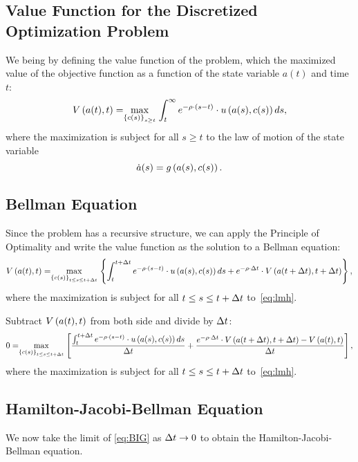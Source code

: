\documentclass[letterpaper,12pt,leqno]{article}
\begin{document}
\subsection{Value Function for the Discretized Optimization Problem}

We being by defining the value function of the problem, which the maximized value of the objective function as a function of the
state variable $a(t)$ and time $t$:
\begin{equation*}
V\bp{a(t),t} =\underset{\bc{c(s)}_{s\geq t}}{\max} \int_{t}^{\infty }e^{-\r \cdot \bp{s-t}}\cdot u\bp{a(s),c(s)} ds,
\end{equation*}
where the maximization is subject for all $s\geq t$ to the law of motion of the state variable
\begin{equation}
\dot{a}(s)=g\left( a(s),c(s) \right).\label{eq:lmh}
\end{equation}

\subsection{Bellman Equation}

Since the problem has a recursive structure, we can apply the Principle of Optimality and write the value function as the solution to a Bellman equation:
\begin{align*}
V\bp{ a(t),t} =\underset{\bc{c(s)}_{t\leq s\leq t+\D t}}{\max }\bc{\int_{t}^{t+\D t}e^{-\r \cdot \bp{ s-t}} \cdot u\bp{a(s),c(s)} ds+e^{-\r  \cdot \D t} \cdot V\bp{ a(t+\D t),t+\D t} },
\end{align*}
where the maximization is subject for all $t\leq s\leq t+\Delta t$ to~\eqref{eq:lmh}.

Subtract $V\left( a(t),t \right) $ from both side and divide by $\Delta t$:
\begin{align}
0=\underset{\bc{c(s)}_{t\leq s\leq t+\D t}}{\max }\bs{\frac{\int_{t}^{t+\D t}e^{-\r \cdot \bp{ s-t}} \cdot u\bp{
a(s),c(s)} ds}{\D t}+ \frac{e^{-\r  \cdot \D t} \cdot V\bp{ a(t+\D t),t+\D t}-V\bp{ a(t),t}}{\D t} },\label{eq:BIG}
\end{align}
where the maximization is subject for all $t\leq s\leq t+\Delta t$ to~\eqref{eq:lmh}.

\subsection{Hamilton-Jacobi-Bellman Equation}

We now take the limit of \eqref{eq:BIG} as $\Delta t\to 0$ to obtain the Hamilton-Jacobi-Bellman equation.
\end{document}
